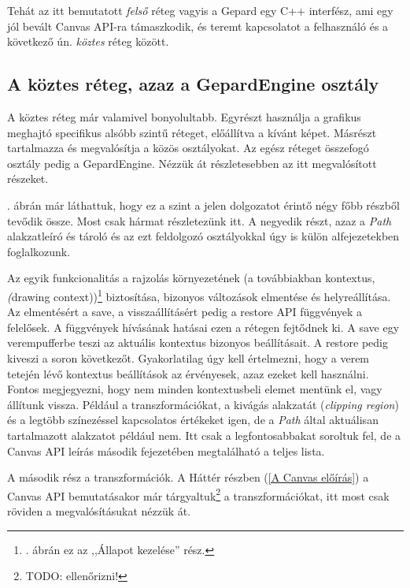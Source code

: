 \documentclass[12pt]{report}
\theoremstyle{definition}
\newcommand{\inenglish}[1]{\textsl{#1}}
\newcommand{\func}[1]{{\textsf{\footnotesize{#1}}}}
\begin{document}
Tehát az itt bemutatott \emph{felső} réteg vagyis a \func{Gepard} egy C++
interfész, ami egy jól bevált Canvas API-ra támaszkodik, és teremt kapcsolatot
a felhasználó és a következő ún. \emph{köztes} réteg között.

    \subsection*{A köztes réteg, azaz a GepardEngine osztály}

A köztes réteg már valamivel bonyolultabb. Egyrészt használja a grafikus
meghajtó specifikus alsóbb szintű réteget, előállítva a kívánt képet. Másrészt
tartalmazza és megvalósítja a közös osztályokat. Az egész réteget összefogó
osztály pedig a \func{GepardEngine}. Nézzük át részletesebben az itt
megvalósított részeket.

. ábrán már láthattuk, hogy ez a szint a jelen dolgozatot
érintő négy főbb részből tevődik össze. Most csak hármat részletezünk itt. A
negyedik részt, azaz a \emph{Path} alakzatleíró és tároló és az ezt feldolgozó
osztályokkal úgy is külön alfejezetekben foglalkozunk.

Az egyik funkcionalitás a rajzolás környezetének (a továbbiakban kontextus,
\inenglish(drawing context))\footnote{. ábrán ez az
,,Állapot kezelése'' rész.} biztosítása, bizonyos változások elmentése és
helyreállítása. Az elmentésért a \func{save}, a visszaállításért pedig a
\func{restore} API függvények a felelősek. A függvények hívásának hatásai ezen
a rétegen fejtődnek ki. A \func{save} egy verempufferbe teszi az aktuális
kontextus bizonyos beállításait. A \func{restore} pedig kiveszi a soron
következőt. Gyakorlatilag úgy kell értelmezni, hogy a verem tetején lévő
kontextus beállítások az érvényesek, azaz ezeket kell használni. Fontos
megjegyezni, hogy nem minden kontextusbeli elemet mentünk el, vagy állítunk
vissza. Például a transzformációkat, a kivágás alakzatát (\inenglish{clipping
region}) és a legtöbb színezéssel kapcsolatos értékeket igen, de a \emph{Path}
által aktuálisan tartalmazott alakzatot például nem. Itt csak a
legfontosabbakat soroltuk fel, de a Canvas API leírás \cite{Cabanier:14:HCC}
második fejezetében megtalálható a teljes lista.

A második rész a transzformációk. A Háttér részben (\ref{A Canvas
előírás}) a Canvas API bemutatásakor már tárgyaltuk\footnote{TODO:
ellenőrizni!} a transzformációkat, itt most csak röviden a
megvalósításukat nézzük át.
\end{document}
